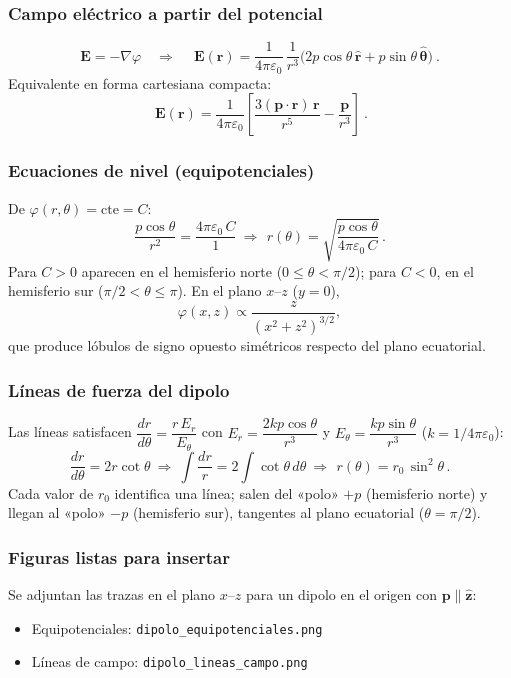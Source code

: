 \documentclass{article}
\begin{document}
\subsubsection*{Campo eléctrico a partir del potencial}
\[
\mathbf E=-\nabla\varphi
\quad\Rightarrow\quad
\boxed{\ 
\mathbf E(\mathbf r)=\frac{1}{4\pi\varepsilon_0}\,\frac{1}{r^{3}}
\Big(2p\cos\theta\,\hat{\mathbf r}+p\sin\theta\,\hat{\boldsymbol\theta}\Big)\ }.
\]
Equivalente en forma cartesiana compacta:
\[
\boxed{\ 
\mathbf E(\mathbf r)=\frac{1}{4\pi\varepsilon_0}\left[
\frac{3(\mathbf p\!\cdot\!\mathbf r)\,\mathbf r}{r^{5}}
-\frac{\mathbf p}{r^{3}}\right]\ }.
\]

\subsubsection*{Ecuaciones de nivel (equipotenciales)}
De $\varphi(r,\theta)=\text{cte}=C$:
\[
\frac{p\cos\theta}{r^{2}}=\frac{4\pi\varepsilon_0\,C}{1}
\ \Longrightarrow\
\boxed{\,r(\theta)=\sqrt{\frac{p\cos\theta}{4\pi\varepsilon_0\,C}}\,}.
\]
Para $C>0$ aparecen en el hemisferio norte ($0\le\theta<\pi/2$); para $C<0$, en el hemisferio sur ($\pi/2<\theta\le\pi$). En el plano $x$–$z$ ($y=0$),
\[
\varphi(x,z)\propto \frac{z}{(x^{2}+z^{2})^{3/2}},
\]
que produce lóbulos de signo opuesto simétricos respecto del plano ecuatorial.

\subsubsection*{Líneas de fuerza del dipolo}
Las líneas satisfacen $\dfrac{dr}{d\theta}=\dfrac{r\,E_r}{E_\theta}$ con
$E_r=\dfrac{2kp\cos\theta}{r^{3}}$ y $E_\theta=\dfrac{kp\sin\theta}{r^{3}}$ ($k=1/4\pi\varepsilon_0$):
\[
\frac{dr}{d\theta}=2r\cot\theta
\ \Longrightarrow\
\int\frac{dr}{r}=2\int\cot\theta\,d\theta
\ \Rightarrow\
\boxed{\,r(\theta)=r_0\,\sin^{2}\theta\,}.
\]
Cada valor de $r_0$ identifica una línea; salen del «polo» $+p$ (hemisferio norte) y llegan al «polo» $-p$ (hemisferio sur), tangentes al plano ecuatorial ($\theta=\pi/2$).

\subsubsection*{Figuras listas para insertar}
Se adjuntan las trazas en el plano $x$–$z$ para un dipolo en el origen con $\mathbf p\parallel \hat{\mathbf z}$:

\begin{itemize}
\item Equipotenciales: \texttt{dipolo\_equipotenciales.png}
\item Líneas de campo: \texttt{dipolo\_lineas\_campo.png}
\end{itemize}
\end{document}
